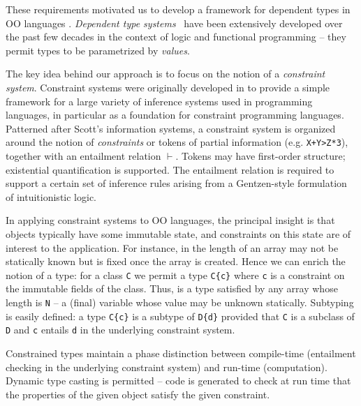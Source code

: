 These requirements motivated us to develop a framework for dependent
types in OO languages \cite{constrained-types}.  {\em Dependent type
systems}~\cite{dependent-types,xi99dependent,ocrz-ecoop03,aspinall-attapl,cayenne,epigram-matter,calc-constructions}
have been extensively developed over the past few decades in the
context of logic and functional programming -- they permit types to be
parametrized by {\em values}.

The key idea behind our approach is to focus on the notion of a {\em
constraint system}. Constraint systems were originally developed in
\cite{cccc} to provide a simple framework for a large variety of
inference systems used in programming languages, in particular as a
foundation for constraint programming languages.  Patterned after
Scott's information systems, a constraint system is
organized around the notion of {\em constraints} or tokens of partial
information (e.g.{} {\tt X+Y>Z*3}), together with an entailment
relation $\vdash$.  Tokens may have first-order structure; existential
quantification is supported. The entailment relation is required to
support a certain set of inference rules arising from a Gentzen-style
formulation of intuitionistic logic.

In applying constraint systems to OO languages, the principal insight
is that objects typically have some immutable state, and constraints on
this state are of interest to the application.  For instance, in \Java{}
the length of an array may not be statically known but is fixed once
the array is created. Hence we can enrich the notion of a type: for a
class {\tt C} we permit a type {\tt C\{c\}} where {\tt c} is a
constraint on the immutable fields of the class. Thus, 
 is a type satisfied by any array whose length
is {\tt N} -- a (final) variable whose value may be unknown
statically. Subtyping is easily defined: a type {\tt C\{c\}} is a
subtype of {\tt D\{d\}} 
provided that {\tt C} is a subclass of {\tt D} and {\tt c}
entails {\tt d} in the underlying constraint system.

Constrained types maintain a phase distinction between compile-time
(entailment checking in the underlying constraint system) and run-time
(computation).  Dynamic type casting is permitted -- code is generated
to check at run time that the properties of the given object satisfy
the given constraint.

